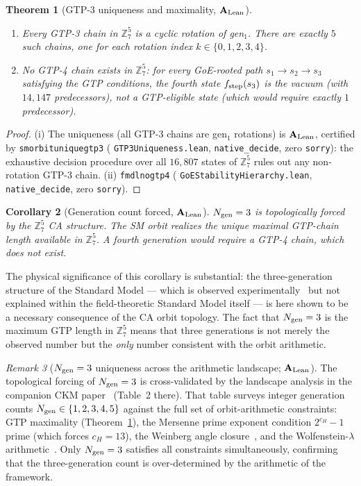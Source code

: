 \documentclass[11pt]{article}
\newtheorem{theorem}{Theorem}[section]
\newtheorem{corollary}[theorem]{Corollary}
\theoremstyle{remark}
\newtheorem{remark}[theorem]{Remark}
\newcommand{\Ngen}{N_{\rm gen}}
\newcommand{\lean}[1]{%
  \penalty-100
  \begingroup\def\_{\textunderscore\allowbreak}\texttt{#1}\endgroup}
\newcommand{\CatAL}{\ensuremath{\textbf{A}_{\rm Lean}}}
\begin{document}
\begin{theorem}[GTP-3 uniqueness and maximality, $\CatAL$]\label{thm:gtp3_unique}
\begin{enumerate}[nosep,label=(\roman*)]
\item Every GTP-3 chain in $\mathbb{Z}_7^5$ is a cyclic rotation of gen$_1$.
      There are exactly $5$ such chains, one for each rotation index $k \in \{0,1,2,3,4\}$.
\item No GTP-4 chain exists in $\mathbb{Z}_7^5$: for every GoE-rooted path $s_1 \to s_2 \to s_3$
      satisfying the GTP conditions, the fourth state $f_{\rm step}(s_3)$ is the vacuum
      (with $14{,}147$ predecessors), not a GTP-eligible state (which would require exactly $1$
      predecessor).
\end{enumerate}
\end{theorem}

\begin{proof}
(i) The uniqueness (all GTP-3 chains are gen$_1$ rotations) is $\CatAL$,
certified by \lean{sm\_orbit\_unique\_gtp3}
(\lean{GTP3Uniqueness.lean}, \texttt{native\_decide},
zero \texttt{sorry}): the exhaustive decision procedure over all $16{,}807$
states of $\mathbb{Z}_7^5$ rules out any non-rotation GTP-3 chain.
(ii) \lean{fmdl\_no\_gtp4} (\lean{GoEStabilityHierarchy.lean}, \texttt{native\_decide},
zero \texttt{sorry}).
\end{proof}

\begin{corollary}[Generation count forced, $\CatAL$]\label{cor:ngen_forced}
$\Ngen = 3$ is topologically forced by the $\mathbb{Z}_7^5$ CA structure.
The SM orbit realizes the unique maximal GTP-chain length available in $\mathbb{Z}_7^5$.
A fourth generation would require a GTP-4 chain, which does not exist.
\end{corollary}

The physical significance of this corollary is substantial: the three-generation
structure of the Standard Model --- which is observed experimentally~\cite{PDG2022}
but not explained within the field-theoretic Standard Model itself --- is here
shown to be a necessary consequence of the CA orbit topology.
The fact that $\Ngen = 3$ is the maximum GTP length in $\mathbb{Z}_7^5$ means that
three generations is not merely the observed number but the \emph{only} number
consistent with the orbit arithmetic.

\begin{remark}[$\Ngen = 3$ uniqueness across the arithmetic landscape; $\CatAL$]
\label{rem:ngen_landscape}
The topological forcing of $\Ngen = 3$ is cross-validated by the landscape analysis
in the companion CKM paper~\cite{SpivackCKM} (Table~2 there).
That table surveys integer generation counts $\Ngen \in \{1, 2, 3, 4, 5\}$ against
the full set of orbit-arithmetic constraints: GTP maximality
(Theorem~\ref{thm:gtp3_unique}), the Mersenne prime exponent condition
$2^{c_H} - 1$ prime (which forces $c_H = 13$), the Weinberg angle
closure~\cite{SpivackWeinberg}, and the Wolfenstein-$\lambda$ arithmetic~\cite{SpivackCKM}.
Only $\Ngen = 3$ satisfies all constraints simultaneously, confirming that
the three-generation count is over-determined by the arithmetic of the framework.
\end{remark}
\end{document}
